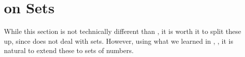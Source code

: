 \section{ on Sets}\label{sec:Number_Theory_on_Sets}
While this section is not technically different than , it is worth it to split these up, since  does not deal with sets.
However, using what we learned in , , it is natural to extend these to sets of numbers.











% 





